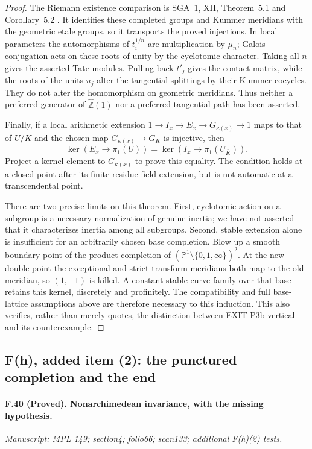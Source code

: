 \begin{proof}
The Riemann existence comparison is SGA~1, XII, Theorem~5.1 and
Corollary~5.2 \citep{SGA1}. It identifies these completed groups and
Kummer meridians with the geometric etale groups, so it transports
the proved injections. In local parameters the automorphisms of
$t_i^{1/n}$ are multiplication by $\mu_n$; Galois conjugation acts on
these roots of unity by the cyclotomic character. Taking all $n$
gives the asserted Tate modules. Pulling back $t'_j$ gives the contact
matrix, while the roots of the units $u_j$ alter the tangential
splittings by their Kummer cocycles. They do not alter the homomorphism
on geometric meridians. Thus neither a preferred generator of
$\widehat{\mathbb Z}(1)$ nor a preferred tangential path has been
asserted.

Finally, if a local arithmetic extension
$1\to I_x\to E_x\to G_{\kappa(x)}\to1$ maps to that of $U/K$ and the
chosen map $G_{\kappa(x)}\to G_K$ is injective, then
\[
 \ker(E_x\to\pi_1(U))=
 \ker(I_x\to\pi_1(U_{\bar K})).
\]
Project a kernel element to $G_{\kappa(x)}$ to prove this equality.
The condition holds at a closed point after its finite residue-field
extension, but is not automatic at a transcendental point.

There are two precise limits on this theorem. First, cyclotomic action
on a subgroup is a necessary normalization of genuine inertia; we have
not asserted that it characterizes inertia among all subgroups.
Second, stable extension alone is insufficient for an arbitrarily
chosen base completion. Blow up a smooth boundary point of the product
completion of $(\mathbb P^1\setminus\{0,1,\infty\})^2$. At the new
double point the exceptional and strict-transform meridians both map
to the old meridian, so $(1,-1)$ is killed. A constant stable curve
family over that base retains this kernel, discretely and profinitely.
The compatibility and full base-lattice assumptions above are therefore
necessary to this induction. This also verifies, rather than merely
quotes, the distinction between EXIT P3b-vertical and its counterexample.
\end{proof}

\subsection{F(h), added item (2): the punctured completion and the end}

\paragraph{F.40 (Proved). Nonarchimedean invariance, with the missing hypothesis.}
\textit{Manuscript: MPL 149; section4; folio66; scan133; additional F(h)(2) tests.}

